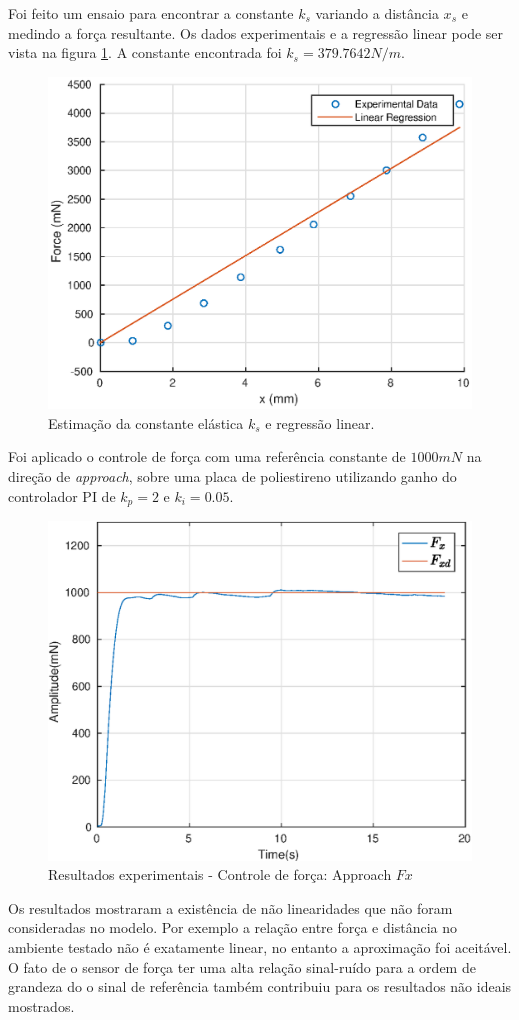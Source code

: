 Foi feito um ensaio para encontrar a constante $k_s$ variando a distância $x_s$ e medindo a força resultante. Os dados experimentais e a regressão linear pode ser vista na figura \ref{fig:ks_linreg}. A constante encontrada foi $k_s = 379.7642 N/m$.

\begin{figure}[!ht]
\centering
  \includegraphics[width=0.5\linewidth]{./img/ks_estimation.eps}
  \caption{Estimação da constante elástica $k_s$ e regressão linear.}
  \label{fig:ks_linreg}
\end{figure}%

Foi aplicado o controle de força com uma referência constante de $1000 mN$ na direção de \textit{approach}, sobre uma placa de poliestireno utilizando ganho do controlador PI de $k_p = 2$ e $k_i = 0.05$. 

 \begin{figure}[H]
  \centering
  \includegraphics[width=0.5\linewidth]{./img/force1000_kp2_ki005/Fx.eps}
  \caption{Resultados experimentais - Controle de força: Approach $Fx$}
  \label{fig:sub2}
\end{figure}

Os resultados mostraram a existência de não linearidades que não foram consideradas no modelo. Por exemplo a relação entre força e distância no ambiente testado não é exatamente linear, no entanto a aproximação foi aceitável. O fato de o sensor de força ter uma alta relação sinal-ruído para a ordem de grandeza do o sinal de referência também contribuiu para os resultados não ideais mostrados. 


